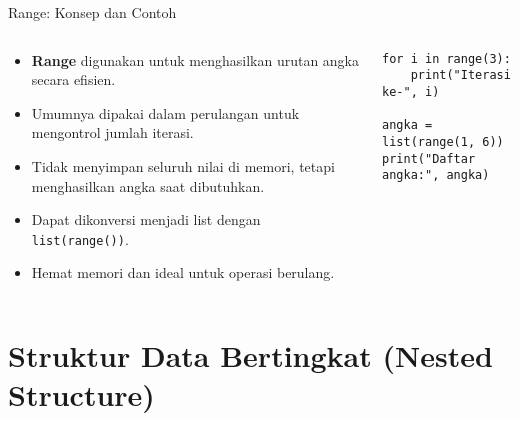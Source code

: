 \documentclass[aspectratio=169, table]{beamer}
\begin{document}
\begin{frame}[fragile]{Range: Konsep dan Contoh}
\vspace{20pt}

\begin{columns}[T]
  \begin{column}{0.48\textwidth}
    \begin{itemize}
      \item \textbf{Range} digunakan untuk menghasilkan urutan angka secara efisien.
      \item Umumnya dipakai dalam perulangan untuk mengontrol jumlah iterasi.
      \item Tidak menyimpan seluruh nilai di memori, tetapi menghasilkan angka saat dibutuhkan.
      \item Dapat dikonversi menjadi list dengan \texttt{list(range())}.
      \item Hemat memori dan ideal untuk operasi berulang.
    \end{itemize}
  \end{column}

  \begin{column}{0.48\textwidth}
    \begin{lstlisting}[style=PythonStyle]
for i in range(3):
    print("Iterasi ke-", i)

angka = list(range(1, 6))
print("Daftar angka:", angka)
    \end{lstlisting}
  \end{column}
\end{columns}

\end{frame}

\section{Struktur Data Bertingkat (Nested Structure)}
\end{document}
